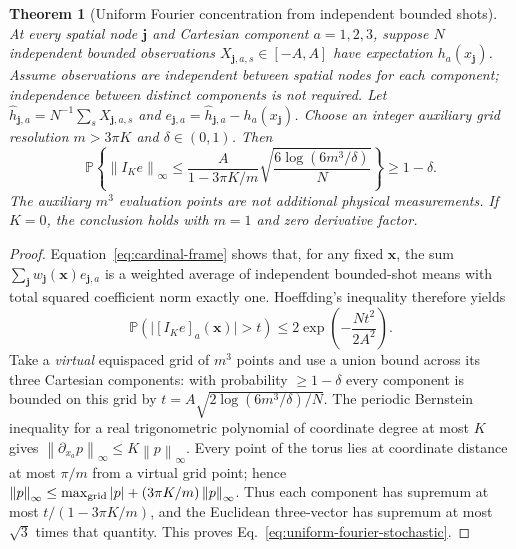 \documentclass[aps,prd,onecolumn,notitlepage,11pt,superscriptaddress,longbibliography]{revtex4-2}
\newtheorem{theorem}{Theorem}
\newcommand{\norm}[1]{\left\lVert#1\right\rVert}
\begin{document}
\begin{theorem}[Uniform Fourier concentration from independent bounded shots]\label{th:indshot}
At every spatial node $\bm j$ and Cartesian component $a=1,2,3$, suppose $N$ independent bounded observations $X_{\bm j,a,s}\in[-A,A]$ have expectation $h_a(x_{\bm j})$. Assume observations are independent \emph{between spatial nodes for each component}; independence between distinct components is not required. Let $\widehat h_{\bm j,a}=N^{-1}\sum_s X_{\bm j,a,s}$ and $e_{\bm j,a}=\widehat h_{\bm j,a}-h_a(x_{\bm j})$. Choose an integer auxiliary grid resolution $m>3\pi K$ and $\delta\in(0,1)$. Then
\begin{equation}\label{eq:uniform-fourier-stochastic}
\boxed{\quad
\mathbb P\left\{\norm{I_K e}_\infty\le
\frac{A}{1-3\pi K/m}\sqrt{\frac{6\log(6m^3/\delta)}{N}}\right\}\ge 1-\delta.
\quad}
\end{equation}
The auxiliary $m^3$ evaluation points are \emph{not} additional physical measurements. If $K=0$, the conclusion holds with $m=1$ and zero derivative factor.
\end{theorem}
\begin{proof}
Equation~\eqref{eq:cardinal-frame} shows that, for any fixed $\bm x$, the sum $\sum_{\bm j}w_{\bm j}(\bm x)e_{\bm j,a}$ is a weighted average of independent bounded-shot means with total squared coefficient norm exactly one. Hoeffding's inequality therefore yields
\begin{equation}
\mathbb P\left(\big|[I_K e]_a(\bm x)\big|>t\right)\le
2\exp\left(-\frac{Nt^2}{2A^2}\right).
\end{equation}
Take a \emph{virtual} equispaced grid of $m^3$ points and use a union bound across its three Cartesian components: with probability $\ge1-\delta$ every component is bounded on this grid by $t=A\sqrt{2\log(6m^3/\delta)/N}$. The periodic Bernstein inequality for a real trigonometric polynomial of coordinate degree at most $K$ gives $\norm{\partial_{x_a}p}_\infty\le K\norm p_\infty$. Every point of the torus lies at coordinate distance at most $\pi/m$ from a virtual grid point; hence
$\norm p_\infty\le \max_{\rm grid}|p|+(3\pi K/m)\norm p_\infty$.
Thus each component has supremum at most $t/(1-3\pi K/m)$, and the Euclidean three-vector has supremum at most $\sqrt3$ times that quantity. This proves Eq.~\eqref{eq:uniform-fourier-stochastic}.
\end{proof}
\end{document}
